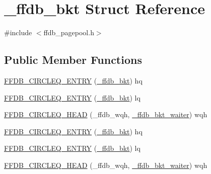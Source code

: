 \hypertarget{struct__ffdb__bkt}{}\section{\+\_\+ffdb\+\_\+bkt Struct Reference}
\label{struct__ffdb__bkt}


{\ttfamily \#include $<$ffdb\+\_\+pagepool.\+h$>$}

\subsection*{Public Member Functions}
\begin{DoxyCompactItemize}
\item 
\mbox{\hyperlink{struct__ffdb__bkt_a0ca6bc2cc68e6384b4b475c41a07fcea}{F\+F\+D\+B\+\_\+\+C\+I\+R\+C\+L\+E\+Q\+\_\+\+E\+N\+T\+RY}} (\mbox{\hyperlink{struct__ffdb__bkt}{\+\_\+ffdb\+\_\+bkt}}) hq
\item 
\mbox{\hyperlink{struct__ffdb__bkt_ac7e62eb857dfeaaf80b72492d3be3584}{F\+F\+D\+B\+\_\+\+C\+I\+R\+C\+L\+E\+Q\+\_\+\+E\+N\+T\+RY}} (\mbox{\hyperlink{struct__ffdb__bkt}{\+\_\+ffdb\+\_\+bkt}}) lq
\item 
\mbox{\hyperlink{struct__ffdb__bkt_af1ee791a45e4526e55dc86d09fb29769}{F\+F\+D\+B\+\_\+\+C\+I\+R\+C\+L\+E\+Q\+\_\+\+H\+E\+AD}} (\+\_\+ffdb\+\_\+wqh, \mbox{\hyperlink{struct__ffdb__bkt__waiter}{\+\_\+ffdb\+\_\+bkt\+\_\+waiter}}) wqh
\item 
\mbox{\hyperlink{struct__ffdb__bkt_a0ca6bc2cc68e6384b4b475c41a07fcea}{F\+F\+D\+B\+\_\+\+C\+I\+R\+C\+L\+E\+Q\+\_\+\+E\+N\+T\+RY}} (\mbox{\hyperlink{struct__ffdb__bkt}{\+\_\+ffdb\+\_\+bkt}}) hq
\item 
\mbox{\hyperlink{struct__ffdb__bkt_ac7e62eb857dfeaaf80b72492d3be3584}{F\+F\+D\+B\+\_\+\+C\+I\+R\+C\+L\+E\+Q\+\_\+\+E\+N\+T\+RY}} (\mbox{\hyperlink{struct__ffdb__bkt}{\+\_\+ffdb\+\_\+bkt}}) lq
\item 
\mbox{\hyperlink{struct__ffdb__bkt_af1ee791a45e4526e55dc86d09fb29769}{F\+F\+D\+B\+\_\+\+C\+I\+R\+C\+L\+E\+Q\+\_\+\+H\+E\+AD}} (\+\_\+ffdb\+\_\+wqh, \mbox{\hyperlink{struct__ffdb__bkt__waiter}{\+\_\+ffdb\+\_\+bkt\+\_\+waiter}}) wqh
\end{DoxyCompactItemize}
